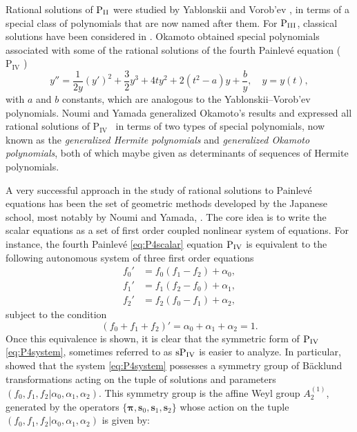 \documentclass{amsart}
\theoremstyle{definition}
\newcommand{\PIV}{$\mathrm{P}_{\mathrm{IV}}\,\,$}
\newcommand{\Pfour}{{\rm P_{IV}}}
\begin{document}
Rational solutions of ${\rm P_{II}}$ were studied by Yablonskii
\cite{yablonskii1959rational} and Vorob'ev \cite{vorob1965rational},
in terms of a special class of polynomials that are now named after
them. For ${\rm P_{III}}$, classical solutions have been considered in
\cite{murata1995classical}.  Okamoto \cite{okamoto1987studies3}
obtained special polynomials associated with some of the rational
solutions of the fourth Painlev\'e equation (\PIV) 
\begin{equation}\label{eq:P4scalar}
  y'' = \frac{1}{2y}(y')^2+\frac{3}{2} y^3 + 4t y^2
  +2(t^2-a)y+\frac{b}{y} ,\quad y=y(t),
\end{equation}
with $a$ and $b$ constants, which are analogous to the
Yablonskii--Vorob'ev polynomials.  Noumi and Yamada
\cite{noumi1999symmetries} generalized Okamoto's results and expressed
all rational solutions of \PIV\ in terms of two types of special
polynomials, now known as the \textit{generalized Hermite polynomials}
and \textit{generalized Okamoto polynomials}, both of which maybe
given as determinants of sequences of Hermite polynomials.


A very successful approach in the study of rational solutions to
Painlev\'e equations has been the set of geometric methods developed
by the Japanese school, most notably by Noumi and Yamada,
\cite{noumi2004painleve}. The core idea is to write the scalar
equations as a set of first order coupled nonlinear system of
equations. For instance, the fourth Painlev\'e \eqref{eq:P4scalar}
equation $\Pfour$ is equivalent to the following autonomous system of
three first order equations
\begin{align}\label{eq:P4system}
f_0'&= f_0(f_1-f_2) + \alpha_0, \nonumber\\
f_1'& = f_1(f_2-f_0) + \alpha_1,\\
f_2'& = f_2(f_0-f_1) + \alpha_2, \nonumber 
\end{align}
subject to the condition
\begin{equation}\label{eq:P4normalization}
(f_0+f_1+f_2)'=\alpha_0+\alpha_1+\alpha_2=1.
\end{equation}
Once this equivalence is shown, it is clear that the symmetric form of
$\Pfour$ \eqref{eq:P4system}, sometimes referred to as $\rm{s}\Pfour$
is easier to analyze. In particular, \cite{noumi1999symmetries} showed
that the system \eqref{eq:P4system} possesses a symmetry group of
B\"acklund transformations acting on the tuple of solutions and
parameters $(f_0,f_1,f_2 |\alpha_0,\alpha_1,\alpha_2)$. This symmetry
group is the affine Weyl group $A_2^{(1)}$, generated by the operators
$\{ \mathbf{\pi},\textbf{s}_0, \textbf{s}_1, \textbf{s}_2\}$ whose
action on the tuple $(f_0,f_1,f_2 |\alpha_0,\alpha_1,\alpha_2)$ is
given by:
\end{document}
